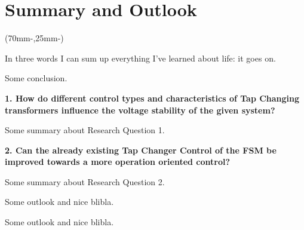 \chapter{Summary and Outlook}
\label{chap:summary}

\begin{textblock*}{.7\textwidth}(70mm-\offset,25mm-\offset)
    \begin{fquote}
        In three words I can sum up everything I've learned about life: it goes on.
    \end{fquote}
\end{textblock*}

Some conclusion.

\textbf{1. How do different control types and characteristics of Tap Changing transformers influence the voltage stability of the given system?}

Some summary about Research Question 1. \lipsum[1]

\textbf{2. Can the already existing Tap Changer Control of the \acf{FSM} be improved towards a more operation oriented control?}

Some summary about Research Question 2. \lipsum[2]

Some outlook and nice blibla. \lipsum[3]

Some outlook and nice blibla. \lipsum[3]